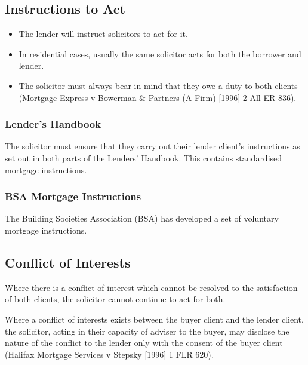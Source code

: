 \documentclass[
]{article}
\providecommand{\tightlist}{%
  \setlength{\itemsep}{0pt}\setlength{\parskip}{0pt}}
\begin{document}
\hypertarget{instructions-to-act}{%
\subsection{Instructions to Act}\label{instructions-to-act}}

\begin{itemize}
\tightlist
\item
  The lender will instruct solicitors to act for it.
\item
  In residential cases, usually the same solicitor acts for both the
  borrower and lender.
\item
  The solicitor must always bear in mind that they owe a duty to both
  clients (Mortgage Express v Bowerman \& Partners (A Firm) {[}1996{]} 2
  All ER 836).
\end{itemize}

\hypertarget{lenders-handbook}{%
\subsubsection{Lender's Handbook}\label{lenders-handbook}}

The solicitor must ensure that they carry out their lender client's
instructions as set out in both parts of the Lenders' Handbook. This
contains standardised mortgage instructions.

\hypertarget{bsa-mortgage-instructions}{%
\subsubsection{BSA Mortgage
Instructions}\label{bsa-mortgage-instructions}}

The Building Societies Association (BSA) has developed a set of
voluntary mortgage instructions.

\hypertarget{conflict-of-interests}{%
\subsection{Conflict of Interests}\label{conflict-of-interests}}

Where there is a conflict of interest which cannot be resolved to the
satisfaction of both clients, the solicitor cannot continue to act for
both.

Where a conflict of interests exists between the buyer client and the
lender client, the solicitor, acting in their capacity of adviser to the
buyer, may disclose the nature of the conflict to the lender only with
the consent of the buyer client (Halifax Mortgage Services v Stepsky
{[}1996{]} 1 FLR 620).
\end{document}
